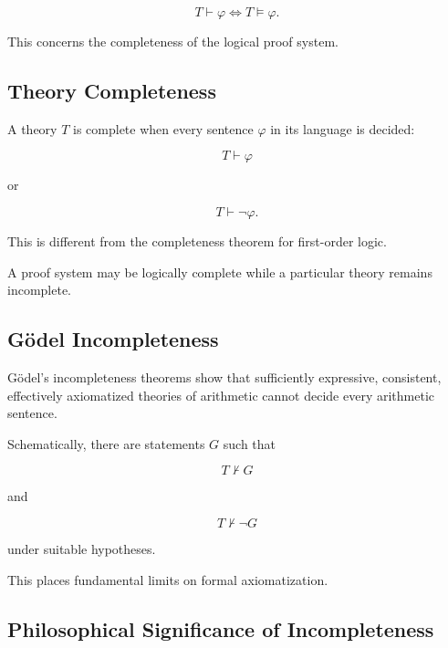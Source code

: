 \[
\boxed{
T\vdash\varphi
\iff
T\models\varphi.
}
\]

This concerns the completeness of the logical proof system.

\subsection{Theory Completeness}
\label{subsec:foundational-theory-completeness}

A theory \(T\) is complete when every sentence \(\varphi\) in its language
is decided:

\[
\boxed{
T\vdash\varphi
}
\]

or

\[
\boxed{
T\vdash\neg\varphi.
}
\]

This is different from the completeness theorem for first-order logic.

A proof system may be logically complete while a particular theory remains
incomplete.

\subsection{Gödel Incompleteness}
\label{subsec:foundational-godel-incompleteness}

Gödel's incompleteness theorems show that sufficiently expressive,
consistent, effectively axiomatized theories of arithmetic cannot decide
every arithmetic sentence.

Schematically, there are statements \(G\) such that

\[
\boxed{
T\nvdash G
}
\]

and

\[
\boxed{
T\nvdash\neg G
}
\]

under suitable hypotheses.

This places fundamental limits on formal axiomatization.

\subsection{Philosophical Significance of Incompleteness}
\label{subsec:philosophical-incompleteness}


